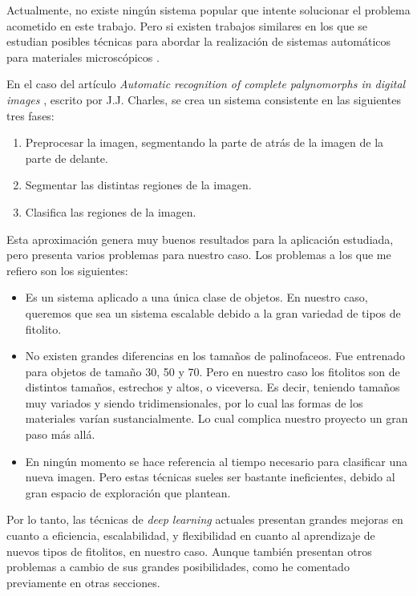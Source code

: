 

Actualmente, no existe ningún sistema popular que intente solucionar el problema acometido en este trabajo. Pero si existen trabajos similares en los que se estudian posibles técnicas para abordar la realización de sistemas automáticos para materiales microscópicos \cite{palyrecog}.

En el caso del artículo \textit{Automatic recognition of complete palynomorphs in digital images} \cite{palyrecog}, escrito por J.J. Charles, se crea un sistema consistente en las siguientes tres fases:

\begin{enumerate}
	\item Preprocesar la imagen, segmentando la parte de atrás de la imagen de la parte de delante.
	\item Segmentar las distintas regiones de la imagen.
	\item Clasifica las regiones de la imagen.
\end{enumerate}

Esta aproximación genera muy buenos resultados para la aplicación estudiada, pero presenta varios problemas para nuestro caso. Los problemas a los que me refiero son los siguientes:

\begin{itemize}
	\item Es un sistema aplicado a una única clase de objetos. En nuestro caso, queremos que sea un sistema escalable debido a la gran variedad de tipos de fitolito.
	\item No existen grandes diferencias en los tamaños de palinofaceos. Fue entrenado para objetos de tamaño 30, 50 y 70. Pero en nuestro caso los fitolitos son de distintos tamaños, estrechos y altos, o viceversa. Es decir, teniendo tamaños muy variados y siendo tridimensionales, por lo cual las formas de los materiales varían sustancialmente. Lo cual complica nuestro proyecto un gran paso más allá.
	\item En ningún momento se hace referencia al tiempo necesario para clasificar una nueva imagen. Pero estas técnicas sueles ser bastante ineficientes, debido al gran espacio de exploración que plantean.
\end{itemize}

Por lo tanto, las técnicas de \textit{deep learning} actuales presentan grandes mejoras en cuanto a eficiencia, escalabilidad, y flexibilidad en cuanto al aprendizaje de nuevos tipos de fitolitos, en nuestro caso. Aunque también presentan otros problemas a cambio de sus grandes posibilidades, como he comentado previamente en otras secciones.